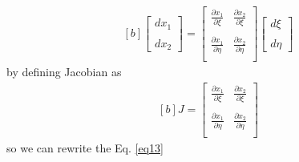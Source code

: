 \documentclass[]{article}
\begin{document}
\begin{equation}\label{eq14}
	\begin{aligned}[b]
		\begin{bmatrix}
			dx_{1}\\
			\\
			dx_{2}  
		\end{bmatrix}
		= \begin{bmatrix}
			\frac{\partial x_{1}}{\partial \xi}       & \frac{\partial x_{2}}{\partial \xi} \\
			\\
			\frac{\partial x_{1}}{\partial \eta}       &\frac{\partial x_{2}}{\partial \eta}\\
		\end{bmatrix}
		\begin{bmatrix}
			d \xi\\
			\\
			d \eta
		\end{bmatrix}
	\end{aligned}
\end{equation}
%
by defining Jacobian as
\begin{equation}\label{eq15}
	\begin{aligned}[b]
		J = \begin{bmatrix}
			\frac{\partial x_{1}}{\partial \xi}       & \frac{\partial x_{2}}{\partial \xi} \\
			\\
			\frac{\partial x_{1}}{\partial \eta}       &\frac{\partial x_{2}}{\partial \eta}\\
			\end{bmatrix}
	\end{aligned}
\end{equation}
so we can rewrite the Eq. \ref{eq13}
\end{document}
